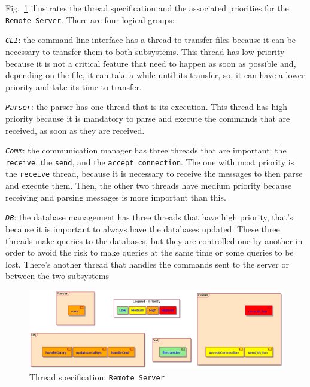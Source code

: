 Fig.~\ref{fig:thread-spec-rs} illustrates the thread specification and the associated priorities for the \texttt{Remote Server}. 
There are four logical groups:
\begin{enum-c}
\item\emph{\texttt{CLI}}: the command line interface has a thread to transfer files because it can be necessary to transfer them to both subsystems.
This thread has low priority because it is not a critical feature that need to happen as soon as possible and, depending on the file, it can take a while until its transfer, so, it can have a lower priority and take its time to transfer.
\item\emph{\texttt{Parser}}: the parser has one thread that is its execution. This thread has high priority because it is mandatory to parse and execute the commands that are received, as soon as they are received.
\item\emph{\texttt{Comm}}: the communication manager has three threads that are important: the \texttt{receive}, the \texttt{send}, and the \texttt{accept connection}. The one with most priority is the \texttt{receive} thread, because it is necessary to receive the messages to then parse and execute them. Then, the other two threads have medium priority because receiving and parsing messages is more important than this.
\item\emph{\texttt{DB}}: the database management has three threads that have high priority, that's because it is important to always have the databases updated. These three threads make queries to the databases, but they are controlled one by another in order to avoid the risk to make queries at the same time or some queries to be lost. There's another thread that handles the commands sent to the server or between the two subsystems
\end{enum-c}
%
\begin{figure}[htb!]
\centering
    \includegraphics[width=0.8\columnwidth]{./img/thread-spec-rs.png}
  \caption{Thread specification: \texttt{Remote Server}}%
\label{fig:thread-spec-rs}
\end{figure}
%

